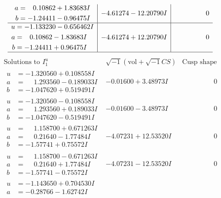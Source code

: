 \documentclass[1p]{elsarticle_modified}
\theoremstyle{definition}
\newcommand{\I}{\sqrt{-1}}
\begin{document}
$$\begin{array}{c|c|c}
\begin{aligned}
a &= \phantom{-}0.10862 + 1.83683 I \\
b &= -1.24411 - 0.96475 I\end{aligned}
 & -4.61274 - 12.20790 I & \phantom{-0.000000 } 0 \\ \hline\begin{aligned}
u &= -1.133230 - 0.656462 I \\
a &= \phantom{-}0.10862 - 1.83683 I \\
b &= -1.24411 + 0.96475 I\end{aligned}
 & -4.61274 + 12.20790 I & \phantom{-0.000000 } 0\\
 \hline 
 \end{array}$$\newpage$$\begin{array}{c|c|c}  
\text{Solutions to }I^u_{1}& \I (\text{vol} + \sqrt{-1}CS) & \text{Cusp shape}\\
 \hline 
\begin{aligned}
u &= -1.320560 + 0.108558 I \\
a &= \phantom{-}1.293560 - 0.189033 I \\
b &= -1.047620 + 0.519491 I\end{aligned}
 & -0.01600 + 3.48973 I & \phantom{-0.000000 } 0 \\ \hline\begin{aligned}
u &= -1.320560 - 0.108558 I \\
a &= \phantom{-}1.293560 + 0.189033 I \\
b &= -1.047620 - 0.519491 I\end{aligned}
 & -0.01600 - 3.48973 I & \phantom{-0.000000 } 0 \\ \hline\begin{aligned}
u &= \phantom{-}1.158700 + 0.671263 I \\
a &= \phantom{-}0.21640 - 1.77484 I \\
b &= -1.57741 + 0.75572 I\end{aligned}
 & -4.07231 + 12.53520 I & \phantom{-0.000000 } 0 \\ \hline\begin{aligned}
u &= \phantom{-}1.158700 - 0.671263 I \\
a &= \phantom{-}0.21640 + 1.77484 I \\
b &= -1.57741 - 0.75572 I\end{aligned}
 & -4.07231 - 12.53520 I & \phantom{-0.000000 } 0 \\ \hline\begin{aligned}
u &= -1.143650 + 0.704530 I \\
a &= -0.28766 - 1.62742 I \\

\end{aligned}
\end{array}$$
\end{document}
